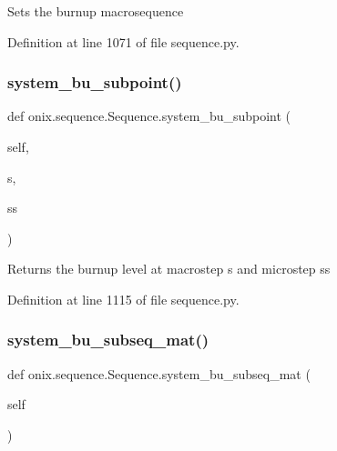 \begin{DoxyVerb}Sets the burnup macrosequence
\end{DoxyVerb}
 

Definition at line 1071 of file sequence.\+py.

\mbox{\label{classonix_1_1sequence_1_1Sequence_a337a06633a4f3ebc5e04116be4de44f4}} 
\subsubsection{\texorpdfstring{system\+\_\+bu\+\_\+subpoint()}{system\_bu\_subpoint()}}
{\footnotesize\ttfamily def onix.\+sequence.\+Sequence.\+system\+\_\+bu\+\_\+subpoint (\begin{DoxyParamCaption}\item[{}]{self,  }\item[{}]{s,  }\item[{}]{ss }\end{DoxyParamCaption})}

\begin{DoxyVerb}Returns the burnup level at macrostep s and microstep ss\end{DoxyVerb}
 

Definition at line 1115 of file sequence.\+py.

\mbox{\label{classonix_1_1sequence_1_1Sequence_a7b1c3865a12804e84a32a428601afe77}} 
\subsubsection{\texorpdfstring{system\+\_\+bu\+\_\+subseq\+\_\+mat()}{system\_bu\_subseq\_mat()}\hspace{0.1cm}{\footnotesize\ttfamily [1/2]}}
{\footnotesize\ttfamily def onix.\+sequence.\+Sequence.\+system\+\_\+bu\+\_\+subseq\+\_\+mat (\begin{DoxyParamCaption}\item[{}]{self }\end{DoxyParamCaption})}

